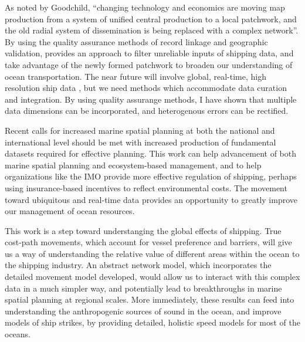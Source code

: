 

As noted by Goodchild, ``changing technology and economics are moving map production from a system of unified central production to a local patchwork, and the old radial system of dissemination is being replaced with a complex network''\citep{goodchild1999cartographic}. By using the quality assurance methods of record linkage and geographic validation, provides an approach to filter unreliable inputs of shipping data, and take advantage of the newly formed patchwork to broaden our understanding of ocean transportation. The near future will involve global, real-time, high resolution ship data \citep{JonesGoogle2012,carson2012satellite}, but we need methods which accommodate data curation and integration. By using quality assurange methods, I have shown that multiple data dimensions can be incorporated, and heterogenous errors can be rectified.


Recent calls for increased marine spatial planning at both the national and international level should be met with increased production of fundamental datasets required for effective planning. This work can help advancement of both marine spatial planning and ecosystem-based management, and to help organizations like the IMO provide more effective regulation of shipping, perhaps using insurance-based incentives to reflect environmental costs. The movement toward ubiquitous and real-time data provides an opportunity to greatly improve our management of ocean resources.

This work is a step toward understanging the global effects of shipping. True cost-path movements, which account for vessel preference and barriers, will give us a way of understanding the relative value of different areas within the ocean to the shipping industry. An abstract network model, which incorporates the detailed movement model developed, would allow us to interact with this complex data in a much simpler way, and potentially lead to breakthroughs in marine spatial planning at regional scales. More immediately, these results can feed into understanding the anthropogenic sources of sound in the ocean, and improve models of ship strikes, by providing detailed, holistic speed models for most of the oceans.

